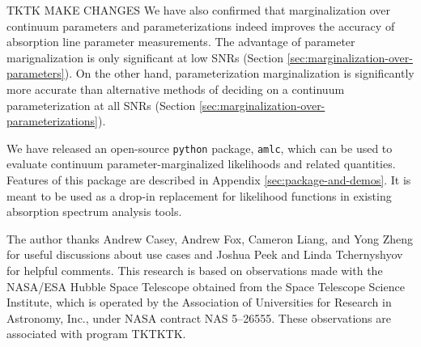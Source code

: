\documentclass[trackchanges]{aastex62}
\newcommand{\pkgname}{\texttt{amlc}}
\begin{document}
TKTK MAKE CHANGES
We have also confirmed that marginalization over continuum parameters and parameterizations indeed improves the accuracy of absorption line parameter measurements.
The advantage of parameter marignalization is only significant at low SNRs (Section \ref{sec:marginalization-over-parameters}).
On the other hand, parameterization marginalization is significantly more accurate than alternative methods of deciding on a continuum parameterization at all SNRs (Section \ref{sec:marginalization-over-parameterizations}).

We have released an open-source \texttt{python} package, \pkgname, which can be used to evaluate continuum parameter-marginalized likelihoods and related quantities.
Features of this package are described in Appendix \ref{sec:package-and-demos}.
It is meant to be used as a drop-in replacement for likelihood functions in existing absorption spectrum analysis tools.

\acknowledgments
The author thanks Andrew Casey, Andrew Fox, Cameron Liang, and Yong Zheng for useful discussions about use cases and Joshua Peek and Linda Tchernyshyov for helpful comments.
This research is based on observations made with the NASA/ESA Hubble Space Telescope obtained from the Space Telescope Science Institute, which is operated by the Association of Universities for Research in Astronomy, Inc., under NASA contract NAS 5–26555. These observations are associated with program TKTKTK.


\appendix
\end{document}

